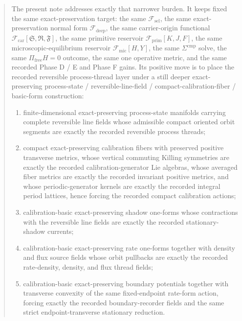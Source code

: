 \documentclass[11pt]{article}
\newcommand{\GaugeAux}{Y}
\newcommand{\MicFunctional}{\mathscr F_{\mathrm{mic}}}
\newcommand{\PrimFunctional}{\mathscr F_{\mathrm{prim}}}
\newcommand{\CarrierFunctional}{\mathscr F_{\mathrm{car}}}
\newcommand{\DeepFunctional}{\mathscr F_{\mathrm{deep}}}
\newcommand{\StemFunctional}{\mathscr F_{\mathrm{sel}}}
\newcommand{\PrimStrain}{K}
\newcommand{\PrimNeutral}{J}
\newcommand{\PrimFree}{F}
\newcommand{\CarrierSeed}{\mathfrak S}
\newcommand{\RelabelSeed}{\mathfrak R}
\newcommand{\FreeSeed}{\mathfrak F}
\begin{document}
\begin{abstract}
The present note addresses exactly that narrower burden. It keeps fixed the same exact-preservation target: the same \(\StemFunctional\), the same exact-preservation normal form \(\DeepFunctional\), the same carrier-origin functional \(\CarrierFunctional[\CarrierSeed,\RelabelSeed,\FreeSeed]\), the same primitive reservoir \(\PrimFunctional[\PrimStrain,\PrimNeutral,\PrimFree]\), the same microscopic-equilibrium reservoir \(\MicFunctional[H,\GaugeAux]\), the same \(\Sigma^{\mathrm{cmp}}\) solve, the same \(\Pi_{\mathrm{free}}H=0\) outcome, the same one operative metric, and the same recorded Phase D / E and Phase F gains. Its positive move is to place the recorded reversible process-thread layer under a still deeper exact-preserving process-state / reversible-line-field / compact-calibration-fiber / basic-form construction:
\begin{enumerate}
    \item finite-dimensional exact-preserving process-state manifolds carrying complete reversible line fields whose admissible compact oriented orbit segments are exactly the recorded reversible process threads;
    \item compact exact-preserving calibration fibers with preserved positive transverse metrics, whose vertical commuting Killing symmetries are exactly the recorded calibration-generator Lie algebras, whose averaged fiber metrics are exactly the recorded invariant positive metrics, and whose periodic-generator kernels are exactly the recorded integral period lattices, hence forcing the recorded compact calibration actions;
    \item calibration-basic exact-preserving shadow one-forms whose contractions with the reversible line fields are exactly the recorded stationary-shadow currents;
    \item calibration-basic exact-preserving rate one-forms together with density and flux source fields whose orbit pullbacks are exactly the recorded rate-density, density, and flux thread fields;
    \item calibration-basic exact-preserving boundary potentials together with transverse convexity of the same fixed-endpoint rate-form action, forcing exactly the recorded boundary-recorder fields and the same strict endpoint-transverse stationary reduction.
\end{enumerate}


\end{abstract}
\end{document}
